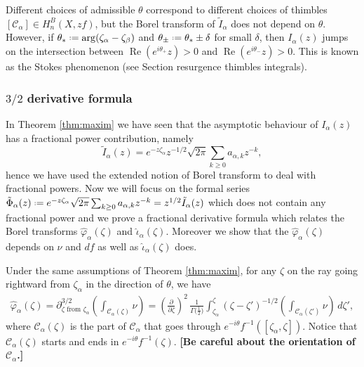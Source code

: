 \documentclass[11pt,a4paper,twoside,leqno,noamsfonts]{amsart}
\numberwithin{equation}{section}
\begin{document}
\begin{remark}
Different choices of admissible $\theta$ correspond to different choices of thimbles $[\mathcal{C}_{\alpha}]\in H_n^{B}(X,zf)$, but the Borel transform of $\tilde{I}_{\alpha}$ does not depend on $\theta$. However, if $\theta_*\defeq\arg(\zeta_{\alpha}-\zeta_{\beta})$ and $\theta_{\pm}\defeq\theta_*\pm\delta$ for small $\delta$, then $I_{\alpha}(z)$ jumps on the intersection between $\operatorname{Re}(e^{i\theta_+}z)>0$ and $\operatorname{Re}(e^{i\theta_-}z)>0$. This is known as the Stokes phenomenon (see Section resurgence thimbles integrals).  
\end{remark}

\subsubsection{$3/2$ derivative formula}

In Theorem \ref{thm:maxim} we have seen that the asymptotic behaviour of $I_\alpha(z)$ has a fractional power contribution, namely \[\tilde{I}_{\alpha}(z)=e^{-z\zeta_\alpha}z^{-1/2}\sqrt{2\pi}\sum_{k\geq 0}a_{\alpha,k}z^{-k},\] hence we have used the extended notion of Borel transform to deal with fractional powers. Now we will focus on the formal series $\tilde{\Phi}_\alpha(z)\defeq e^{-z\zeta_\alpha}\sqrt{2\pi}\sum_{k\geq 0}a_{\alpha,k}z^{-k}=z^{1/2}\tilde{I}_\alpha(z)$ which does not contain any fractional power and we prove a fractional derivative formula which relates the Borel transforms $\hat{\varphi}_\alpha(\zeta)$ and $\hat{\iota}_{\alpha}(\zeta)$. Moreover we show that the $\hat{\varphi}_{\alpha}(\zeta)$ depends on $\nu$ and $df$ as well as $\hat{\iota}_{\alpha}(\zeta)$ does. 

\begin{corollary}\label{int:deriv-formula} 
Under the same assumptions of Theorem \ref{thm:maxim}, for any $\zeta$ on the ray going rightward from $\zeta_\alpha$ in the direction of $\theta$, we have
\begin{multline}\label{formula1}
\hat{\varphi}_{\alpha}(\zeta)=\partial^{3/2}_{\zeta \text{ from }\zeta_\alpha} \left( \int_{\mathcal{C}_\alpha(\zeta)}\nu \right)={\left(\tfrac{\partial}{\partial \zeta}\right)^2}\,\frac{1}{\Gamma\big(\tfrac{1}{2}\big)} \int_{\zeta_\alpha}^\zeta (\zeta-\zeta')^{-1/2} {\left( \int_{\mathcal{C}_\alpha(\zeta')} \nu \right)}\,d\zeta',
\end{multline}
where $\mathcal{C}_\alpha(\zeta)$ is the part of $\mathcal{C}_\alpha$ that goes through $e^{-i\theta}f^{-1}([\zeta_\alpha, \zeta ])$. Notice that $\mathcal{C}_\alpha(\zeta)$ starts and ends in $e^{-i\theta}f^{-1}(\zeta)$. \textbf{[Be careful about the orientation of $\mathcal{C}_\alpha$.]}
\end{corollary}
\end{document}
